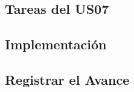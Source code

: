 


\subsection{Tareas del US07}
\label{sub:us07_tasks}

  



  \subsection{Implementación}
  \label{sub:implementacion_iteracion_3}

      

  \subsection{Registrar el Avance}
  \label{sub:iteracion3_avance}


